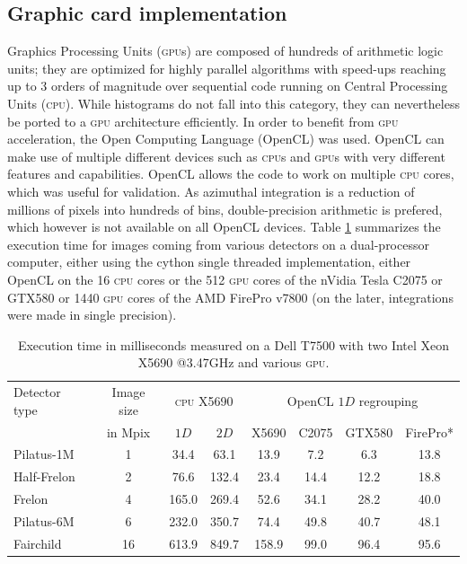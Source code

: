 \documentclass[a4paper]{jpconf}
\begin{document}
\subsection{Graphic card implementation}
Graphics Processing Units (\textsc{gpu}s) are composed of hundreds of
arithmetic logic units; they are optimized for highly
parallel algorithms with speed-ups reaching up to 3 orders of magnitude over sequential
code running on Central Processing Units (\textsc{cpu}).
While histograms do not fall into this category, they can nevertheless be
ported to a \textsc{gpu} architecture efficiently.
In order to benefit from \textsc{gpu} acceleration,
the Open Computing Language\cite{opencl} (OpenCL) was used. OpenCL can make use
of multiple different devices such as \textsc{cpu}s and \textsc{gpu}s with very
different features and capabilities.
OpenCL allows the code to work on multiple \textsc{cpu} cores, which was
useful for validation.
As azimuthal integration is a reduction
of millions of pixels into hundreds of bins, double-precision arithmetic is prefered,
which however is not available on all OpenCL devices.
Table \ref{perfs} summarizes the execution time for images coming from
various detectors on a dual-processor computer, either using the
cython single threaded implementation, either OpenCL on the 16
\textsc{cpu} cores or the 512 \textsc{gpu} cores of the nVidia Tesla C2075 or
GTX580 or 1440 \textsc{gpu} cores of the AMD FirePro v7800 (on the later,
integrations were made in single precision).

\begin{table}[h]
\begin{center}
\caption{\label{perfs}Execution time in milliseconds measured on a
Dell T7500 with two Intel Xeon X5690 @3.47GHz and various \textsc{gpu}.}

\begin{tabular}{|l|c||c|c||c|c|c|c|}
\hline
Detector type   & Image size 	& \multicolumn{2}{|c||}{\textsc{cpu} X5690}& \multicolumn{4}{|c|}{OpenCL $1D$ regrouping} \\
					& in Mpix		& $1D$	&	$2D$	&	X5690	&	C2075	&	GTX580	&	FirePro* \\
\hline
Pilatus-1M 			& 1  			& 34.4  &	63.1	&	13.9	&	7.2		&	6.3		&	13.8 \\
Half-Frelon 		& 2  			& 76.6  &   132.4   &	23.4	&	14.4	&	12.2	&	18.8 \\
Frelon 				& 4  			& 165.0	&	269.4   &	52.6	&	34.1	&	28.2	&	40.0 \\
Pilatus-6M 			& 6  			& 232.0	&	350.7	&	74.4	&	49.8	&	40.7	&	48.1 \\
Fairchild 			& 16 			& 613.9	&	849.7   &	158.9	&	99.0	&	96.4	&	95.6 \\
\hline
\end{tabular}
\end{center}
\end{table}
\end{document}
